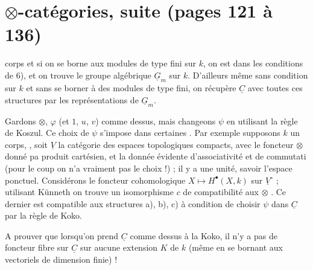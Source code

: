 \documentclass[11pt,a4paper]{article}
\begin{document}
\section*{$\otimes$-catégories, suite (pages 121 à 136)}



corps et si on se borne aux modules de type fini sur $k$, on est dans les
conditions de 6), et on trouve le groupe algébrique $\underline{G}_{m}$ sur
$k$. D'ailleurs même sans condition sur $k$ et sans se borner à des modules de
type fini, on récupère $\underline{C}$ avec toutes ces structures par les
représentations de $\underline{G}_{m}$.

Gardons $\otimes$, $\varphi$ (et $1$, $u$, $v$) comme dessus, mais changeons
$\psi$  en utilisant la règle de Koszul. Ce  choix
de $\psi$ s'impose dans certaines . Par exemple supposons $k$ un
corps, , soit $\underline{V}$ la catégorie des espaces
topologiques compacts, avec le foncteur $\otimes$ donné pa produit
cartésien, et la donnée évidente d'associativité et de commutati
(pour le coup on n'a vraiment pas le choix !) ; il y a une unité, 
savoir l'espace ponctuel. Considérons le foncteur cohomologique
$X \mapsto H^{\bullet}(X,k)$ sur $\underline{V}^{\circ}$ ; utilisant Künneth on
trouve un isomorphisme $c$ de compatibilité aux $\otimes$ . Ce dernier est compatible aux
structures a), b), c) à condition de choisir $\psi$ dans $\underline{C}$ par la
règle de Koko.

A prouver que lorsqu'on prend $\underline{C}$ comme dessus à la Koko, il n'y a
pas de foncteur fibre sur $\underline{C}$ sur aucune extension $K$ de $k$ (même
en se bornant aux vectoriels de dimension finie)
!
\end{document}

